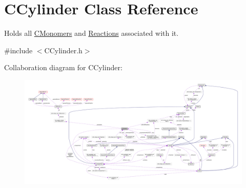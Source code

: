 \hypertarget{classCCylinder}{\section{C\+Cylinder Class Reference}
\label{classCCylinder}
}


Holds all \hyperlink{classCMonomer}{C\+Monomers} and \hyperlink{classReaction}{Reactions} associated with it.  




{\ttfamily \#include $<$C\+Cylinder.\+h$>$}



Collaboration diagram for C\+Cylinder\+:\nopagebreak
\begin{figure}[H]
\begin{center}
\leavevmode
\includegraphics[width=350pt]{classCCylinder__coll__graph}
\end{center}
\end{figure}
